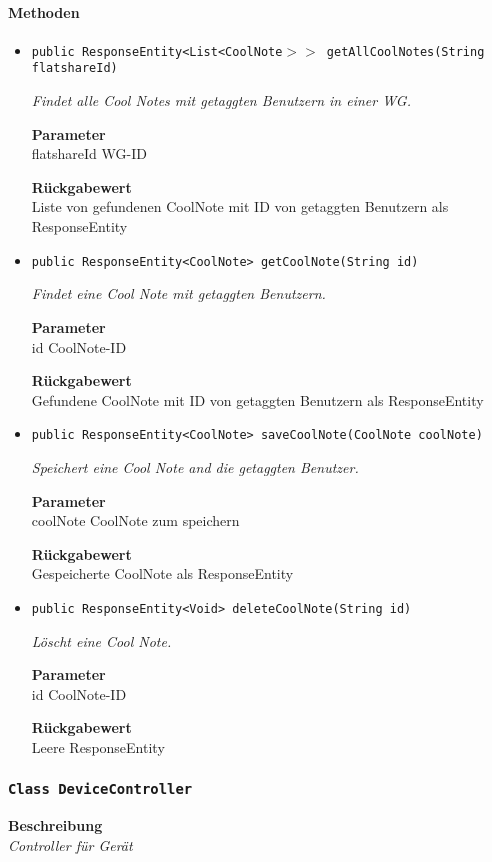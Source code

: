      \paragraph*{Methoden}
     \begin{itemize}
     	\item{\texttt{public ResponseEntity<List<CoolNote$>>$ getAllCoolNotes(String flatshareId)}}
     	
     	\textit{Findet alle Cool Notes mit getaggten Benutzern in einer WG.}
     	
     	\textbf{Parameter} \\
     	flatshareId WG-ID
     	
     	\textbf{Rückgabewert} \\
     	Liste von gefundenen CoolNote mit ID von getaggten Benutzern als ResponseEntity        \item{\texttt{public ResponseEntity<CoolNote> getCoolNote(String id)}}
     	
     	\textit{Findet eine Cool Note mit getaggten Benutzern.}
     	
     	\textbf{Parameter} \\
     	id CoolNote-ID
     	
     	\textbf{Rückgabewert} \\
     	Gefundene CoolNote mit ID von getaggten Benutzern als ResponseEntity        \item{\texttt{public ResponseEntity<CoolNote> saveCoolNote(CoolNote coolNote)}}
     	
     	\textit{Speichert eine Cool Note and die getaggten Benutzer.}
     	
     	\textbf{Parameter} \\
     	coolNote CoolNote zum speichern
     	
     	\textbf{Rückgabewert} \\
     	Gespeicherte CoolNote als ResponseEntity        \item{\texttt{public ResponseEntity<Void> deleteCoolNote(String id)}}
     	
     	\textit{Löscht eine Cool Note.}
     	
     	\textbf{Parameter} \\
     	id CoolNote-ID
     	
     	\textbf{Rückgabewert} \\
     	Leere ResponseEntity
     \end{itemize}
     \subsubsection{\texttt{Class DeviceController}}
     \textbf{Beschreibung} \\
     \textit{Controller für Gerät}
